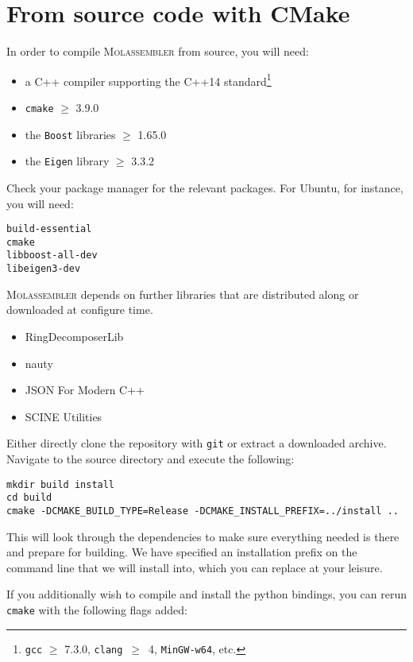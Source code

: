 \documentclass[]{tufte-book}
\begin{document}
\section{From source code with CMake}
In order to compile \textsc{Molassembler} from source, you will need:
\begin{itemize}
  \item a C++ compiler supporting the C++14 standard\footnote{\texttt{gcc} $\ge$
    7.3.0, \texttt{clang}~$\ge$~4, \texttt{MinGW-w64}, etc.}
  \item \texttt{cmake} $\ge$ 3.9.0
  \item the \texttt{Boost} libraries $\ge$ 1.65.0
  \item the \texttt{Eigen} library $\ge$ 3.3.2
\end{itemize}

Check your package manager for the relevant packages. For Ubuntu, for instance,
you will need:

\begin{Verbatim}
build-essential
cmake
libboost-all-dev
libeigen3-dev
\end{Verbatim}

\textsc{Molassembler} depends on further libraries that are distributed along or
downloaded at configure time.

\begin{itemize}
  \item RingDecomposerLib~\cite{Flachsenberg2017, Kolodzik2012} 
  \item nauty~\cite{McKay2014}
  \item JSON For Modern C++~\cite{Lohmann2013} 
  \item SCINE Utilities~\cite{Brunken2019}
\end{itemize}
  
Either directly clone the repository with \texttt{git} or extract a downloaded
archive. Navigate to the source directory and execute the following:

\begin{Verbatim}
mkdir build install
cd build
cmake -DCMAKE_BUILD_TYPE=Release -DCMAKE_INSTALL_PREFIX=../install ..
\end{Verbatim}

This will look through the dependencies to make sure everything needed is there
and prepare for building. We have specified an installation prefix on the
command line that we will install into, which you can replace at your leisure.

If you additionally wish to compile and install the python bindings, you can
rerun \texttt{cmake} with the following flags added:
\end{document}
